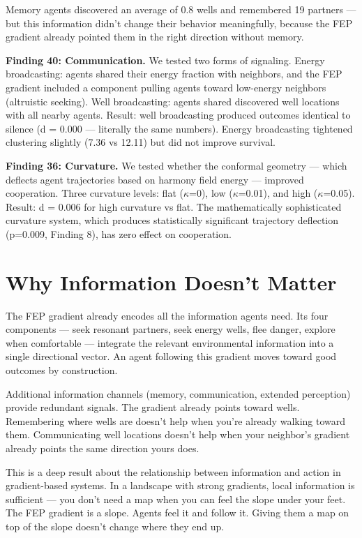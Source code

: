 Memory agents discovered an average of 0.8 wells and remembered 19 partners --- but this information didn't change their behavior meaningfully, because the FEP gradient already pointed them in the right direction without memory.

\textbf{Finding 40: Communication.} We tested two forms of signaling. Energy broadcasting: agents shared their energy fraction with neighbors, and the FEP gradient included a component pulling agents toward low-energy neighbors (altruistic seeking). Well broadcasting: agents shared discovered well locations with all nearby agents. Result: well broadcasting produced outcomes identical to silence (d = 0.000 --- literally the same numbers). Energy broadcasting tightened clustering slightly (7.36 vs 12.11) but did not improve survival.

\textbf{Finding 36: Curvature.} We tested whether the conformal geometry --- which deflects agent trajectories based on harmony field energy --- improved cooperation. Three curvature levels: flat ($\kappa$=0), low ($\kappa$=0.01), and high ($\kappa$=0.05). Result: d = 0.006 for high curvature vs flat. The mathematically sophisticated curvature system, which produces statistically significant trajectory deflection (p=0.009, Finding 8), has zero effect on cooperation.

\section{Why Information Doesn't Matter}\label{why-information-doesnt-matter}

The FEP gradient already encodes all the information agents need. Its four components --- seek resonant partners, seek energy wells, flee danger, explore when comfortable --- integrate the relevant environmental information into a single directional vector. An agent following this gradient moves toward good outcomes by construction.

Additional information channels (memory, communication, extended perception) provide redundant signals. The gradient already points toward wells. Remembering where wells are doesn't help when you're already walking toward them. Communicating well locations doesn't help when your neighbor's gradient already points the same direction yours does.

This is a deep result about the relationship between information and action in gradient-based systems. In a landscape with strong gradients, local information is sufficient --- you don't need a map when you can feel the slope under your feet. The FEP gradient is a slope. Agents feel it and follow it. Giving them a map on top of the slope doesn't change where they end up.

